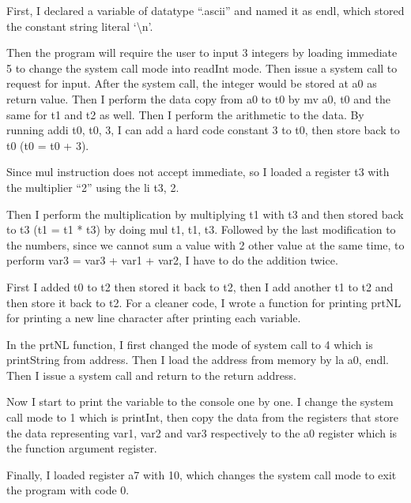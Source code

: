 \documentclass[10pt,a4paper]{article}
\begin{document}
\begin{ans} 

    First, I declared a variable of datatype “.ascii” and named it as endl, which stored the constant 
string literal `\textbackslash n'. 

    Then the program will require the user to input 3 integers by loading immediate 5 to change the system call 
mode into readInt mode. Then issue a system call to request for input. After the system call, the integer would 
be stored at a0 as return value. Then I perform the data copy from a0 to t0 by mv a0, t0 and the same for t1 
and t2 as well. Then I perform the arithmetic to the data. By running addi t0, t0, 3, I can add a hard code 
constant 3 to t0, then store back to t0 (t0 = t0 + 3). 
 
    Since mul instruction does not accept immediate, so I loaded a register t3 with the multiplier “2” using the li t3, 2. 
 
    Then I perform the multiplication by multiplying t1 with t3 and then stored back to t3 (t1 = t1 * t3) by doing mul t1, t1, t3. 
Followed by the last modification to the numbers, since we cannot sum a value with 2 other value at the same time, to perform 
var3 = var3 + var1 + var2, I have to do the addition twice. 
 
	First I added t0 to t2 then stored it back to t2, then I add another t1 to t2 and then store it back to t2. For a cleaner code, 
I wrote a function for printing prtNL for printing a new line character after printing each variable. 
 
	In the prtNL function, I first changed the mode of system call to 4 which is printString from address. 
Then I load the address from memory by la a0, endl. Then I issue a system call and return to the return address. 
 
	Now I start to print the variable to the console one by one. I change the system call mode to 1 which is printInt, 
then copy the data from the registers that store the data representing var1, var2 and var3 respectively 
to the a0 register which is the function argument register. 
 
	Finally, I loaded register a7 with 10, which changes the system call mode to exit the program with code 0. 
 
\break


\end{ans}
\end{document}
